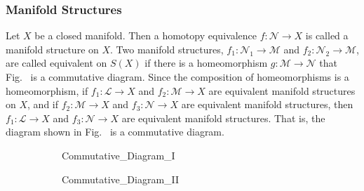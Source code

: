 \documentclass[crop=false,class=book,oneside]{standalone}
\begin{document}
        \subsubsection{Manifold Structures}
            Let $X$ be a closed manifold. Then a homotopy
            equivalence $f:\mathcal{N}\rightarrow{X}$ is called a
            manifold structure on $X$. Two manifold structures,
            $f_{1}:\mathcal{N}_{1}\rightarrow{\mathcal{M}}$ and
            $f_{2}:\mathcal{N}_{2}\rightarrow{\mathcal{M}}$, are called
            equivalent on $S(X)$ if there is a homeomorphism
            $g:\mathcal{M}\rightarrow\mathcal{N}$ that
            Fig.~
            is a commutative diagram. Since the composition of homeomorphisms
            is a homeomorphism, if $f_{1}:\mathcal{L}\rightarrow{X}$ and
            $f_{2}:\mathcal{M}\rightarrow{X}$ are equivalent manifold structures
            on $X$, and if $f_{2}:\mathcal{M}\rightarrow{X}$
            and $f_{3}:\mathcal{N}\rightarrow{X}$ are equivalent
            manifold structures, then $f_{1}:\mathcal{L}\rightarrow{X}$
            and $f_{3}:\mathcal{N}\rightarrow{X}$ are equivalent manifold
            structures. That is, the diagram shown in
            Fig.~
            is a commutative diagram.
            \begin{figure}[H]
                \captionsetup{type=figure}
                \begin{subfigure}[b]{0.49\textwidth}
                    \centering
                    \captionsetup{type=figure}
                    {Commutative_Diagram_I}
                    \label{fig:Surgery_Theory_Equivalent_Manifold_Structure_Diagram}
                \end{subfigure}
                \begin{subfigure}[b]{0.49\textwidth}
                    \centering
                    \captionsetup{type=figure}
                    {Commutative_Diagram_II}
                    \label{fig:Surgery_Theory_Equivalent_%
                           Manifold_Structure_Diagram_Equivalence_Relation}
                \end{subfigure}
                \label{Commutative Diagrams for Manifold Structures.}
                \label{fig:Commutative_Diagrams_for_Manifold_Structures}
            \end{figure}
\end{document}
